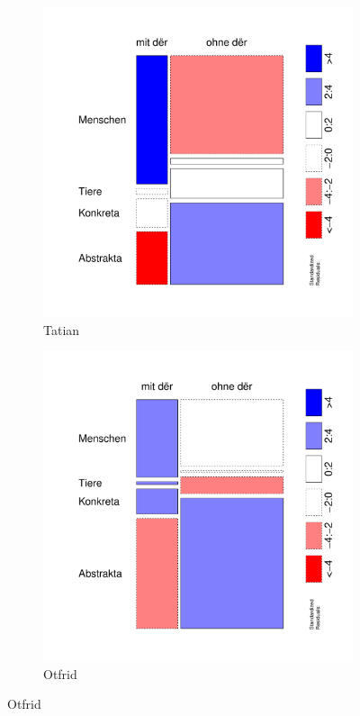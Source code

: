 \begin{figure}
\begin{subfigure}[b]{.5\linewidth}
  \includegraphics[height=.25\textheight]{generated/images/residuals-bel-T}
\caption {Tatian}
\end{subfigure}%
\begin{subfigure}[b]{.5\linewidth}
  \includegraphics[height=.25\textheight]{generated/images/residuals-bel-O}
\caption {Otfrid}
\end{subfigure}


\end{figure}

